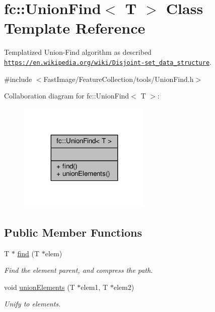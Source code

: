 \hypertarget{classfc_1_1UnionFind}{}\section{fc\+:\+:Union\+Find$<$ T $>$ Class Template Reference}
\label{classfc_1_1UnionFind}


Templatized Union-\/\+Find algorithm as described \href{https://en.wikipedia.org/wiki/Disjoint-set_data_structure}{\tt https\+://en.\+wikipedia.\+org/wiki/\+Disjoint-\/set\+\_\+data\+\_\+structure}.  




{\ttfamily \#include $<$Fast\+Image/\+Feature\+Collection/tools/\+Union\+Find.\+h$>$}



Collaboration diagram for fc\+:\+:Union\+Find$<$ T $>$\+:
\nopagebreak
\begin{figure}[H]
\begin{center}
\leavevmode
\includegraphics[width=179pt]{df/df4/classfc_1_1UnionFind__coll__graph}
\end{center}
\end{figure}
\subsection*{Public Member Functions}
\begin{DoxyCompactItemize}
\item 
T $\ast$ \hyperlink{classfc_1_1UnionFind_afea42f5456053c1185991449afeedb01}{find} (T $\ast$elem)
\begin{DoxyCompactList}\small\item\em Find the element parent, and compress the path. \end{DoxyCompactList}\item 
void \hyperlink{classfc_1_1UnionFind_af2a4f58739f658a16006fb023a6fa9fc}{union\+Elements} (T $\ast$elem1, T $\ast$elem2)
\begin{DoxyCompactList}\small\item\em Unify to elements. \end{DoxyCompactList}\end{DoxyCompactItemize}


